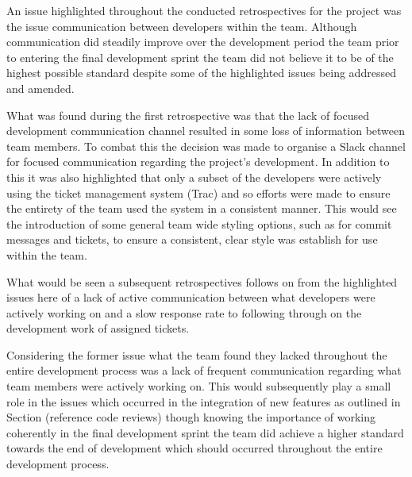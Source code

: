 \documentclass{l3proj}
\begin{document}




An issue highlighted throughout the conducted retrospectives for the project was the issue communication between developers within the team. Although communication did steadily improve over the development period the team prior to entering the final development sprint the team did not believe it to be of the highest possible standard despite some of the highlighted issues being addressed and amended. 

What was found during the first retrospective was that the lack of focused development communication channel resulted in some loss of information between team members. To combat this the decision was made to organise a Slack channel for focused communication regarding the project's development. In addition to this it was also highlighted that only a subset of the developers were actively using the ticket management system (Trac) and so efforts were made to ensure the entirety of the team used the system in a consistent manner. This would see the introduction of some general team wide styling options, such as for commit messages and tickets, to ensure a consistent, clear style was  establish for use within the team. 

What would be seen a subsequent retrospectives follows on from the highlighted issues here of a lack of active communication between what developers were actively working on and a slow response rate to following through on the development work of assigned tickets. 

Considering the former issue what the team found they lacked throughout the entire development process was a lack of frequent communication regarding what team members were actively working on. This would subsequently play a small role in the issues which occurred in the integration of new features as outlined in Section (reference code reviews) though knowing the importance of working coherently in the final development sprint the team did achieve a higher standard towards the end of development which should occurred throughout the entire development process. 
\end{document}
